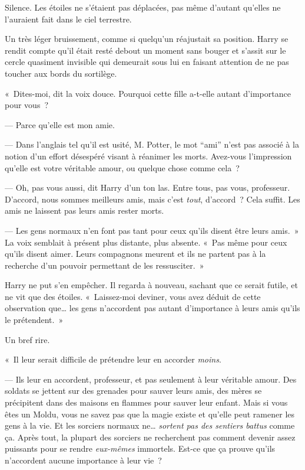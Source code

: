 Silence.
Les étoiles ne s'étaient pas déplacées, pas même d'autant qu'elles ne l'auraient fait dans le ciel terrestre.

Un très léger bruissement, comme si quelqu'un réajustait sa position.
Harry se rendit compte qu'il était resté debout un moment sans bouger et s'assit sur le cercle quasiment invisible qui demeurait sous lui en faisant attention de ne pas toucher aux bords du sortilège.

«~Dites-moi, dit la voix douce.
Pourquoi cette fille a-t-elle autant d'importance pour vous~?

--- Parce qu'elle est mon amie.

--- Dans l'anglais tel qu'il est usité, M. Potter, le mot “ami” n'est pas associé à la notion d'un effort désespéré visant à réanimer les morts.
Avez-vous l'impression qu'elle est votre véritable amour, ou quelque chose comme cela~?

--- Oh, pas vous aussi, dit Harry d'un ton las.
Entre tous, pas vous, professeur.
D'accord, nous sommes meilleurs amis, mais c'est \emph{tout}, d'accord~?
Cela suffit.
Les amis ne laissent pas leurs amis rester morts.

--- Les gens normaux n'en font pas tant pour ceux qu'ils disent être leurs amis.~»
La voix semblait à présent plus distante, plus absente.
«~Pas même pour ceux qu'ils disent aimer.
Leurs compagnons meurent et ils ne partent pas à la recherche d'un pouvoir permettant de les ressusciter.~»

Harry ne put s'en empêcher.
Il regarda à nouveau, sachant que ce serait futile, et ne vit que des étoiles.
«~Laissez-moi deviner, vous avez déduit de cette observation que… les gens n'accordent pas autant d'importance à leurs amis qu'ils le prétendent.~»

Un bref rire.

«~Il leur serait difficile de prétendre leur en accorder \emph{moins}.

--- Ils leur en accordent, professeur, et pas seulement à leur véritable amour.
Des soldats se jettent sur des grenades pour sauver leurs amis, des mères se précipitent dans des maisons en flammes pour sauver leur enfant.
Mais si vous êtes un Moldu, vous ne savez pas que la magie existe et qu'elle peut ramener les gens à la vie.
Et les sorciers normaux ne…
\emph{sortent pas des sentiers battus} comme ça.
Après tout, la plupart des sorciers ne recherchent pas comment devenir assez puissants pour se rendre \emph{eux-mêmes} immortels.
Est-ce que ça prouve qu'ils n'accordent aucune importance à leur vie~?

